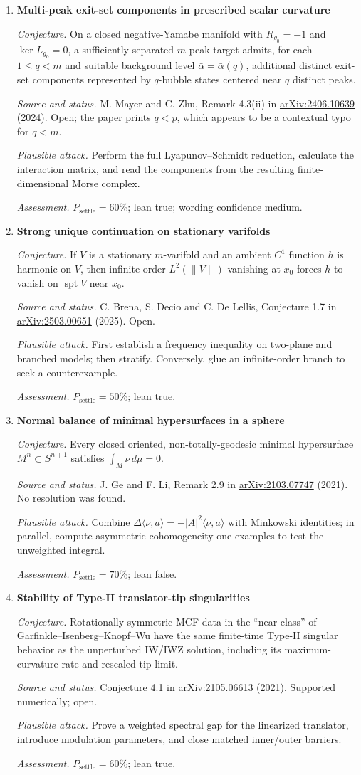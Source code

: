 \documentclass[11pt]{article}
\newcommand{\cand}[5]{%
  \item \textbf{#1}\par
  \emph{Conjecture.} #2\par
  \emph{Source and status.} #3\par
  \emph{Plausible attack.} #4\par
  \emph{Assessment.} #5
}
\newcommand{\psettle}{P_{\mathrm{settle}}}
\begin{document}
\begin{enumerate}[label=\textbf{L\arabic*.}]
\cand{Multi-peak exit-set components in prescribed scalar curvature}
{On a closed negative-Yamabe manifold with $R_{g_0}=-1$ and $\ker L_{g_0}=0$, a sufficiently separated $m$-peak target admits, for each $1\le q<m$ and suitable background level $\bar\alpha=\bar\alpha(q)$, additional distinct exit-set components represented by $q$-bubble states centered near $q$ distinct peaks.}
{M. Mayer and C. Zhu, Remark 4.3(ii) in \href{https://arxiv.org/abs/2406.10639}{arXiv:2406.10639} (2024).  Open; the paper prints $q<p$, which appears to be a contextual typo for $q<m$.}
{Perform the full Lyapunov--Schmidt reduction, calculate the interaction matrix, and read the components from the resulting finite-dimensional Morse complex.}
{$\psettle=60\%$; lean true; wording confidence medium.}

\cand{Strong unique continuation on stationary varifolds}
{If $V$ is a stationary $m$-varifold and an ambient $C^1$ function $h$ is harmonic on $V$, then infinite-order $L^2(\|V\|)$ vanishing at $x_0$ forces $h$ to vanish on $\operatorname{spt}V$ near $x_0$.}
{C. Brena, S. Decio and C. De Lellis, Conjecture 1.7 in \href{https://arxiv.org/abs/2503.00651}{arXiv:2503.00651} (2025).  Open.}
{First establish a frequency inequality on two-plane and branched models; then stratify.  Conversely, glue an infinite-order branch to seek a counterexample.}
{$\psettle=50\%$; lean true.}

\cand{Normal balance of minimal hypersurfaces in a sphere}
{Every closed oriented, non-totally-geodesic minimal hypersurface $M^n\subset S^{n+1}$ satisfies $\int_M\nu\,d\mu=0$.}
{J. Ge and F. Li, Remark 2.9 in \href{https://arxiv.org/abs/2103.07747}{arXiv:2103.07747} (2021).  No resolution was found.}
{Combine $\Delta\langle\nu,a\rangle=-|A|^2\langle\nu,a\rangle$ with Minkowski identities; in parallel, compute asymmetric cohomogeneity-one examples to test the unweighted integral.}
{$\psettle=70\%$; lean false.}

\cand{Stability of Type-II translator-tip singularities}
{Rotationally symmetric MCF data in the ``near class'' of Garfinkle--Isenberg--Knopf--Wu have the same finite-time Type-II singular behavior as the unperturbed IW/IWZ solution, including its maximum-curvature rate and rescaled tip limit.}
{Conjecture 4.1 in \href{https://arxiv.org/abs/2105.06613}{arXiv:2105.06613} (2021).  Supported numerically; open.}
{Prove a weighted spectral gap for the linearized translator, introduce modulation parameters, and close matched inner/outer barriers.}
{$\psettle=60\%$; lean true.}


\end{enumerate}
\end{document}
